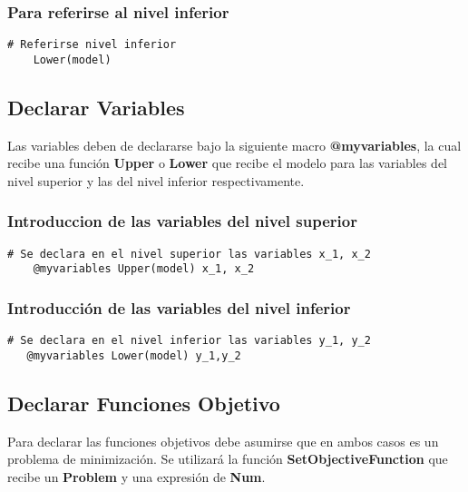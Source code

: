 \subsubsection{Para referirse al nivel inferior}
\begin{lstlisting}[caption={Referirse al nivel inferior}]
    # Referirse nivel inferior
    Lower(model)
\end{lstlisting}


\subsection{Declarar Variables}
Las variables deben de 
declararse bajo la siguiente macro \textbf{@myvariables}, la cual 
recibe una función \textbf{Upper} o \textbf{Lower} que recibe el modelo
para las variables del nivel superior y las del nivel inferior respectivamente.

\subsubsection{Introduccion de  las variables del nivel superior }

\begin{lstlisting}[caption={Introducir las variables del nivel superior}]
    # Se declara en el nivel superior las variables x_1, x_2
    @myvariables Upper(model) x_1, x_2
\end{lstlisting}

\subsubsection{Introducción de las variables del nivel inferior}

\begin{lstlisting}[caption={Introducir las variables del nivel inferior}]
   # Se declara en el nivel inferior las variables y_1, y_2
   @myvariables Lower(model) y_1,y_2
\end{lstlisting}


\subsection{Declarar Funciones Objetivo}

Para declarar las funciones objetivos debe asumirse que en ambos casos es un 
problema de minimización. Se utilizará la función \textbf{SetObjectiveFunction}
que recibe un \textbf{Problem} y una expresión de \textbf{Num}.


